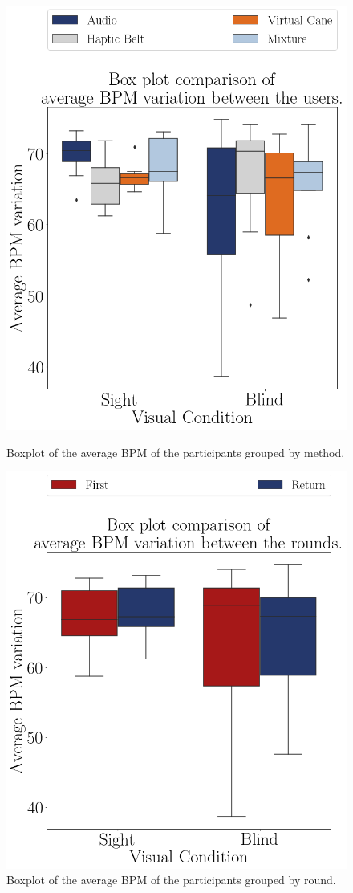 \begin{figure}[!htb]
    \centering
    \begin{minipage}{0.45\textwidth}
        \centering
        \includegraphics[width = 0.8\linewidth]{Resultados/ECG/Figuras/png/boxplot_ecg_bpm_4_scene.png}
        \caption{Boxplot of the average BPM of the participants grouped by method.}
        \label{fig:boxplot_ecg_bpm_4_scene}
    \end{minipage}
    \begin{minipage}{0.45\textwidth}
        \centering
        \includegraphics[width = 0.8\linewidth]{Resultados/ECG/Figuras/png/boxplot_ecg_bpm_4_rounds.png}
        \caption{Boxplot of the average BPM of the participants grouped by round.}
        \label{fig:boxplot_ecg_bpm_4_rounds}
    \end{minipage}
\end{figure}
 
